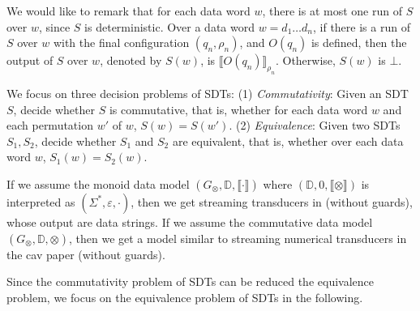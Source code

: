 \documentclass[runningheads,a4paper]{llncs}
\newcommand{\eval}[2]{\llbracket#1\rrbracket_{#2}}
\newcommand\cur{\mathsf{cur}}
\newcommand\dom{\mathsf{dom}}
\newcommand\dd{\mathbb{D}}
\begin{document}

We would like to remark that for each data word $w$, there is at most one run of $S$ over $w$, since $S$ is deterministic. 
Over a data word $w = d_1 \dots d_n$, if there is a run of $S$ over $w$ with the final configuration $(q_n,\rho_n)$, and $O(q_n)$ is defined, then the output of $S$ over $w$, denoted by ${S}(w)$, is $\eval{O(q_n)}{\rho_n}$. Otherwise, ${S}(w)$ is $\bot$.

We focus on three decision problems of SDTs: (1) \emph{Commutativity}: Given an SDT $S$, decide whether $S$ is commutative, that is, whether for each data word $w$ and each permutation $w'$ of $w$, $S(w)=S(w')$. (2) \emph{Equivalence}: Given two SDTs $S_1,S_2$, decide whether $S_1$ and $S_2$ are equivalent, that is, whether over each data word $w$, $S_1(w)=S_2(w)$.


\begin{example}
If we assume the monoid data model $(G_\otimes, \dd, \llbracket \cdot \rrbracket)$ where $(\dd, 0, \llbracket \otimes \rrbracket)$  is interpreted as $(\Sigma^\ast, \varepsilon, \cdot)$, then we get streaming transducers in \cite{RP11} (without guards), whose output are data strings. If we assume the commutative data model $(G_\otimes, \dd, \otimes)$, then we get a model similar to streaming numerical transducers in the cav paper (without guards).
\end{example}

Since the commutativity problem of SDTs can be reduced the equivalence problem, we focus on the equivalence problem of SDTs in the following.
\end{document}
